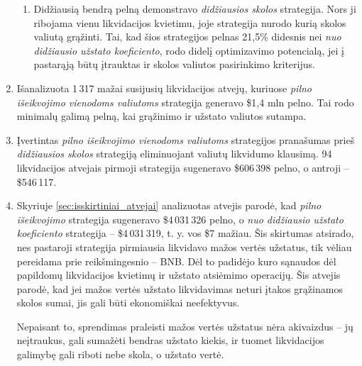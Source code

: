 \documentclass[]{VUMIFTemplateClass}
\begin{document}
\begin{enumerate}
\begin{enumerate}
    \item Didžiausią bendrą pelną demonstravo \textit{didžiausios skolos} strategija. Nors ji ribojama vienu likvidacijos kvietimu, joje strategija nurodo kurią skolos valiutą grąžinti. Tai, kad šios strategijos pelnas 21,5\% didesnis nei \textit{nuo didžiausio užstato koeficiento}, rodo didelį optimizavimo potencialą, jei į pastarąją būtų įtrauktas ir skolos valiutos pasirinkimo kriterijus.
  \end{enumerate}

\item Išanalizuota 1\,317 mažai susijusių likvidacijos atvejų, kuriuose \textit{pilno išeikvojimo vienodoms valiutoms} strategija generavo \$1,4 mln pelno. Tai rodo minimalų galimą pelną, kai grąžinimo ir užstato valiutos sutampa.

\item Įvertintas \textit{pilno išeikvojimo vienodoms valiutoms} strategijos pranašumas prieš \textit{didžiausios skolos} strategiją eliminuojant valiutų likvidumo klausimą. 94 likvidacijos atvejais pirmoji strategija sugeneravo \$606\,398 pelno, o antroji – \$546\,117.

\item Skyriuje \ref{sec:isskirtiniai_atvejai} analizuotas atvejis parodė, kad \textit{pilno išeikvojimo} strategija sugeneravo \$4\,031\,326 pelno, o \textit{nuo didžiausio užstato koeficiento} strategija – \$4\,031\,319, t. y. vos \$7 mažiau. Šis skirtumas atsirado, nes pastaroji strategija pirmiausia likvidavo mažos vertės užstatus, tik vėliau pereidama prie reikšmingesnio – BNB. Dėl to padidėjo kuro sąnaudos dėl papildomų likvidacijos kvietimų ir užstato atsiėmimo operacijų. Šis atvejis parodė, kad jei mažos vertės užstato likvidavimas neturi įtakos grąžinamos skolos sumai, jis gali būti ekonomiškai neefektyvus.

Nepaisant to, sprendimas praleisti mažos vertės užstatus nėra akivaizdus – jų neįtraukus, gali sumažėti bendras užstato kiekis, ir tuomet likvidacijos galimybę gali riboti nebe skola, o užstato vertė.

\end{enumerate}
\end{document}
